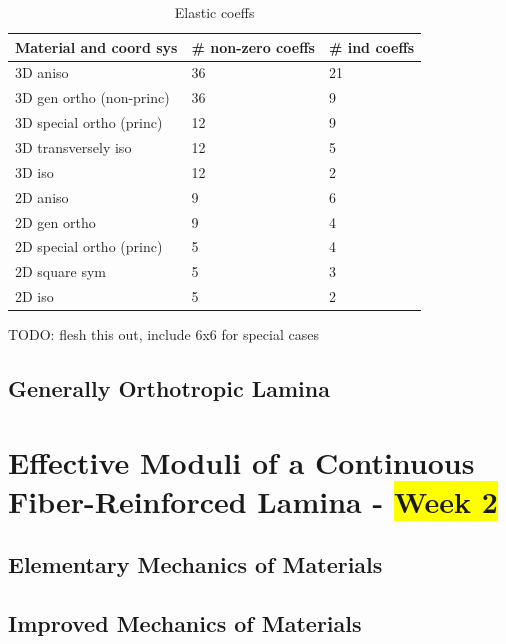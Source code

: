 \documentclass[11pt]{article}
\begin{document}
    \begin{table}[]
        \def\arraystretch{1.2}
        \centering
        \caption{Elastic coeffs}
        \label{my-label}
        \begin{tabular}{lll}
            Material and coord sys   & \# non-zero coeffs & \# ind coeffs \\ \hline
            3D aniso                 & 36                 & 21                \\
            3D gen ortho (non-princ) & 36                 & 9                 \\
            3D special ortho (princ) & 12                 & 9                 \\
            3D transversely iso      & 12                 & 5                 \\
            3D iso                   & 12                 & 2                 \\
            2D aniso                 & 9                  & 6                 \\
            2D gen ortho             & 9                  & 4                 \\
            2D special ortho (princ) & 5                  & 4                 \\
            2D square sym            & 5                  & 3                 \\
            2D iso                   & 5                  & 2                
        \end{tabular}
    \end{table}

    TODO: flesh this out, include 6x6 for special cases

    \subsection{Generally Orthotropic Lamina}

    \section{Effective Moduli of a Continuous Fiber-Reinforced Lamina - \colorbox{Yellow}{Week 2}}

    \subsection{Elementary Mechanics of Materials}

    \subsection{Improved Mechanics of Materials}
\end{document}

